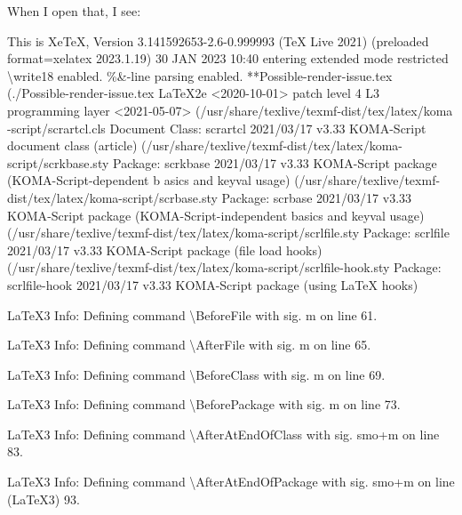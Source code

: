 \documentclass[
  letterpaper,
  DIV=11,
  numbers=noendperiod]{scrartcl}
\newenvironment{Shaded}{\begin{snugshade}}{\end{snugshade}}
\newcommand{\NormalTok}[1]{\textcolor[rgb]{0.00,0.23,0.31}{#1}}
\begin{document}
When I open that, I see:

\begin{Shaded}
\begin{Highlighting}[]
\NormalTok{This is XeTeX, Version 3.141592653{-}2.6{-}0.999993 (TeX Live 2021) (preloaded format=xelatex 2023.1.19)  30 JAN 2023 10:40}
\NormalTok{entering extended mode}
\NormalTok{ restricted \textbackslash{}write18 enabled.}
\NormalTok{ \%\&{-}line parsing enabled.}
\NormalTok{**Possible{-}render{-}issue.tex}
\NormalTok{(./Possible{-}render{-}issue.tex}
\NormalTok{LaTeX2e \textless{}2020{-}10{-}01\textgreater{} patch level 4}
\NormalTok{L3 programming layer \textless{}2021{-}05{-}07\textgreater{} (/usr/share/texlive/texmf{-}dist/tex/latex/koma}
\NormalTok{{-}script/scrartcl.cls}
\NormalTok{Document Class: scrartcl 2021/03/17 v3.33 KOMA{-}Script document class (article)}
\NormalTok{(/usr/share/texlive/texmf{-}dist/tex/latex/koma{-}script/scrkbase.sty}
\NormalTok{Package: scrkbase 2021/03/17 v3.33 KOMA{-}Script package (KOMA{-}Script{-}dependent b}
\NormalTok{asics and keyval usage)}
\NormalTok{(/usr/share/texlive/texmf{-}dist/tex/latex/koma{-}script/scrbase.sty}
\NormalTok{Package: scrbase 2021/03/17 v3.33 KOMA{-}Script package (KOMA{-}Script{-}independent }
\NormalTok{basics and keyval usage)}
\NormalTok{(/usr/share/texlive/texmf{-}dist/tex/latex/koma{-}script/scrlfile.sty}
\NormalTok{Package: scrlfile 2021/03/17 v3.33 KOMA{-}Script package (file load hooks)}
\NormalTok{(/usr/share/texlive/texmf{-}dist/tex/latex/koma{-}script/scrlfile{-}hook.sty}
\NormalTok{Package: scrlfile{-}hook 2021/03/17 v3.33 KOMA{-}Script package (using LaTeX hooks)}


\NormalTok{LaTeX3 Info: Defining command \textbackslash{}BeforeFile with sig. \textquotesingle{}m\textquotesingle{} on line 61.}


\NormalTok{LaTeX3 Info: Defining command \textbackslash{}AfterFile with sig. \textquotesingle{}m\textquotesingle{} on line 65.}


\NormalTok{LaTeX3 Info: Defining command \textbackslash{}BeforeClass with sig. \textquotesingle{}m\textquotesingle{} on line 69.}


\NormalTok{LaTeX3 Info: Defining command \textbackslash{}BeforePackage with sig. \textquotesingle{}m\textquotesingle{} on line 73.}


\NormalTok{LaTeX3 Info: Defining command \textbackslash{}AfterAtEndOfClass with sig. \textquotesingle{}smo+m\textquotesingle{} on line 83.}


\NormalTok{LaTeX3 Info: Defining command \textbackslash{}AfterAtEndOfPackage with sig. \textquotesingle{}smo+m\textquotesingle{} on line}
\NormalTok{(LaTeX3)     93.}



\end{Highlighting}
\end{Shaded}
\end{document}
